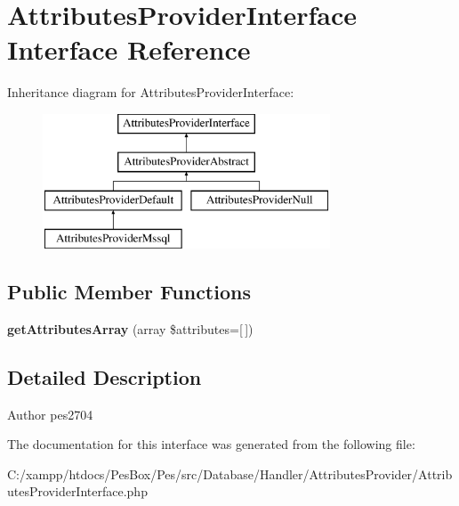 \hypertarget{interface_pes_1_1_database_1_1_handler_1_1_attributes_provider_1_1_attributes_provider_interface}{}\section{Attributes\+Provider\+Interface Interface Reference}
\label{interface_pes_1_1_database_1_1_handler_1_1_attributes_provider_1_1_attributes_provider_interface}
Inheritance diagram for Attributes\+Provider\+Interface\+:\begin{figure}[H]
\begin{center}
\leavevmode
\includegraphics[height=4.000000cm]{interface_pes_1_1_database_1_1_handler_1_1_attributes_provider_1_1_attributes_provider_interface}
\end{center}
\end{figure}
\subsection*{Public Member Functions}
\begin{DoxyCompactItemize}
\item 
\mbox{\label{interface_pes_1_1_database_1_1_handler_1_1_attributes_provider_1_1_attributes_provider_interface_a78e4a9edf711d48cd3ec22eaadf560ea}} 
{\bfseries get\+Attributes\+Array} (array \$attributes=\mbox{[}$\,$\mbox{]})
\end{DoxyCompactItemize}


\subsection{Detailed Description}
\begin{DoxyAuthor}{Author}
pes2704 
\end{DoxyAuthor}


The documentation for this interface was generated from the following file\+:\begin{DoxyCompactItemize}
\item 
C\+:/xampp/htdocs/\+Pes\+Box/\+Pes/src/\+Database/\+Handler/\+Attributes\+Provider/Attributes\+Provider\+Interface.\+php\end{DoxyCompactItemize}
